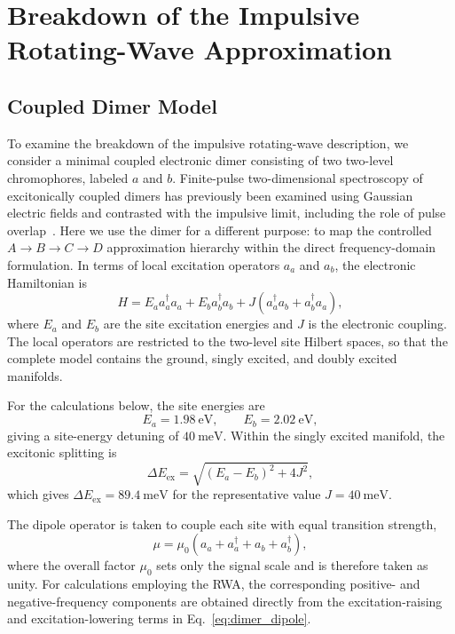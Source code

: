 \section{Breakdown of the Impulsive Rotating-Wave Approximation}
\label{sec:regime_study}

\subsection{Coupled Dimer Model}
\label{subsec:dimer}

To examine the breakdown of the impulsive rotating-wave description,
we consider a minimal coupled electronic dimer consisting of two
two-level chromophores, labeled $a$ and $b$.
Finite-pulse two-dimensional spectroscopy of excitonically coupled
dimers has previously been examined using Gaussian electric fields and
contrasted with the impulsive limit, including the role of pulse
overlap~\cite{Kjellberg2006Dimer}. Here we use the dimer for a
different purpose: to map the controlled
$A\rightarrow B\rightarrow C\rightarrow D$ approximation hierarchy
within the direct frequency-domain formulation.
In terms of local excitation operators $a_a$ and $a_b$, the electronic
Hamiltonian is
%
\begin{equation}
H
=
E_a a_a^\dagger a_a
+
E_b a_b^\dagger a_b
+
J\left(
a_a^\dagger a_b
+
a_b^\dagger a_a
\right),
\label{eq:dimer_hamiltonian}
\end{equation}
%
where $E_a$ and $E_b$ are the site excitation energies and $J$ is the
electronic coupling.
The local operators are restricted to the two-level site Hilbert
spaces, so that the complete model contains the ground,
singly excited, and doubly excited manifolds.

For the calculations below, the site energies are
%
\begin{equation}
E_a = 1.98~\mathrm{eV},
\qquad
E_b = 2.02~\mathrm{eV},
\label{eq:dimer_site_energies}
\end{equation}
%
giving a site-energy detuning of $40~\mathrm{meV}$.
Within the singly excited manifold, the excitonic splitting is
%
\begin{equation}
\Delta E_{\mathrm{ex}}
=
\sqrt{
(E_a-E_b)^2+4J^2
},
\label{eq:dimer_splitting}
\end{equation}
%
which gives
$\Delta E_{\mathrm{ex}}=89.4~\mathrm{meV}$
for the representative value $J=40~\mathrm{meV}$.

The dipole operator is taken to couple each site with equal transition
strength,
%
\begin{equation}
\mu
=
\mu_0
\left(
a_a+a_a^\dagger
+
a_b+a_b^\dagger
\right),
\label{eq:dimer_dipole}
\end{equation}
%
where the overall factor $\mu_0$ sets only the signal scale and is
therefore taken as unity.
For calculations employing the RWA, the corresponding
positive- and negative-frequency components are obtained directly from
the excitation-raising and excitation-lowering terms in
Eq.~\eqref{eq:dimer_dipole}.

